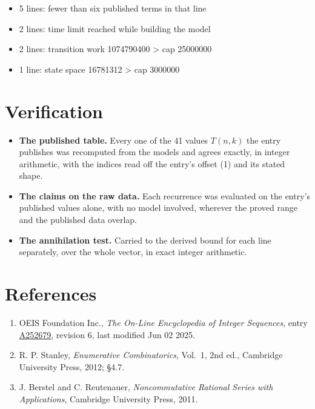 \documentclass[11pt]{article}
\theoremstyle{definition}
\begin{document}
\begin{itemize}

\item 5 lines: fewer than six published terms in that line

\item 2 lines: time limit reached while building the model

\item 2 lines: transition work 1074790400 > cap 25000000

\item 1 line: state space 16781312 > cap 3000000

\end{itemize}

\section{Verification}

\begin{itemize}

\item {\bfseries The published table.} Every one of the 41 values $T(n,k)$ the entry publishes was recomputed from the models and agrees exactly, in integer arithmetic, with the indices read off the entry's offset (1) and its stated shape.

\item {\bfseries The claims on the raw data.} Each recurrence was evaluated on the entry's published values alone, with no model involved, wherever the proved range and the published data overlap.

\item {\bfseries The annihilation test.} Carried to the derived bound for each line separately, over the whole vector, in exact integer arithmetic.

\end{itemize}

\section{References}

\begin{enumerate}

\item OEIS Foundation Inc., \emph{The On-Line Encyclopedia of Integer Sequences}, entry \href{https://oeis.org/A252679}{A252679}, revision 6, last modified Jun 02 2025.

\item R. P. Stanley, \emph{Enumerative Combinatorics}, Vol.~1, 2nd ed., Cambridge University Press, 2012; \S4.7.

\item J. Berstel and C. Reutenauer, \emph{Noncommutative Rational Series with Applications}, Cambridge University Press, 2011.

\end{enumerate}
\end{document}
